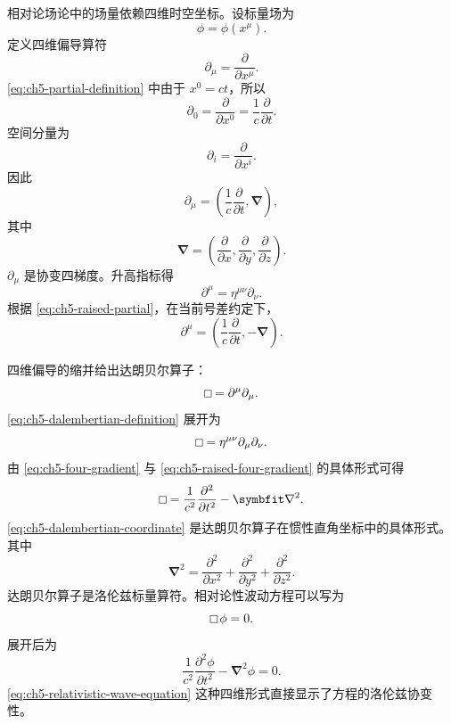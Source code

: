 相对论场论中的场量依赖四维时空坐标。设标量场为
\[
\phi=\phi(x^{\mu}).
\]
定义四维偏导算符
\begin{equation}
\label{eq:ch5-partial-definition}
\partial_{\mu}=\frac{\partial}{\partial x^{\mu}}.
\end{equation}
\eqref{eq:ch5-partial-definition} 中由于 $x^{0}=ct$，所以
\[
\partial_{0}=\frac{\partial}{\partial x^{0}}=\frac{1}{c}\frac{\partial}{\partial t}.
\]
空间分量为
\[
\partial_{i}=\frac{\partial}{\partial x^{i}}.
\]
因此
\begin{equation}
\label{eq:ch5-four-gradient}
\partial_{\mu}=
\left(
\frac{1}{c}\frac{\partial}{\partial t},\bm{\nabla}
\right),
\end{equation}
其中
\[
\bm{\nabla}=
\left(
\frac{\partial}{\partial x},
\frac{\partial}{\partial y},
\frac{\partial}{\partial z}
\right).
\]
$\partial_{\mu}$ 是协变四梯度。升高指标得
\begin{equation}
\label{eq:ch5-raised-partial}
\partial^{\mu}=\eta^{\mu\nu}\partial_{\nu}.
\end{equation}
根据 \eqref{eq:ch5-raised-partial}，在当前号差约定下，
\begin{equation}
\label{eq:ch5-raised-four-gradient}
\partial^{\mu}=
\left(
\frac{1}{c}\frac{\partial}{\partial t},-\bm{\nabla}
\right).
\end{equation}

四维偏导的缩并给出达朗贝尔算子：
\begin{equation}
\label{eq:ch5-dalembertian-definition}
\dalembert =\partial^{\mu}\partial_{\mu}.
\end{equation}
\eqref{eq:ch5-dalembertian-definition} 展开为
\[
\dalembert =\eta^{\mu\nu}\partial_{\mu}\partial_{\nu}.
\]
由 \eqref{eq:ch5-four-gradient} 与 \eqref{eq:ch5-raised-four-gradient} 的具体形式可得
\begin{equation}
\label{eq:ch5-dalembertian-coordinate}
\dalembert =
\frac{1}{c^{2}}\frac{\partial^{2}}{\partial t^{2}}-\bm{\nabla}^{2}.
\end{equation}
\eqref{eq:ch5-dalembertian-coordinate} 是达朗贝尔算子在惯性直角坐标中的具体形式。
其中
\[
\bm{\nabla}^{2}=
\frac{\partial^{2}}{\partial x^{2}}
+
\frac{\partial^{2}}{\partial y^{2}}
+
\frac{\partial^{2}}{\partial z^{2}}.
\]
达朗贝尔算子是洛伦兹标量算符。相对论性波动方程可以写为
\begin{equation}
\label{eq:ch5-relativistic-wave-equation}
\dalembert \phi=0.
\end{equation}
展开后为
\[
\frac{1}{c^{2}}\frac{\partial^{2}\phi}{\partial t^{2}}-\bm{\nabla}^{2}\phi=0.
\]
\eqref{eq:ch5-relativistic-wave-equation} 这种四维形式直接显示了方程的洛伦兹协变性。


